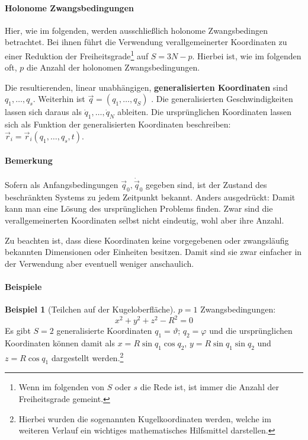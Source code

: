 \documentclass[oneside]{book}
\theoremstyle{definition}
\newtheorem*{beispiel*}{Beispiel}
\newcommand{\dotvec}[1]{\dot{\vec{#1}}}
\begin{document}
\paragraph{Holonome Zwangsbedingungen}
Hier, wie im folgenden, werden ausschließlich holonome Zwangsbedingen betrachtet. Bei ihnen führt die Verwendung verallgemeinerter Koordinaten zu einer Reduktion der Freiheitsgrade\footnote{Wenn im folgenden von $S$ oder $s$ die Rede ist, ist immer die Anzahl der Freiheitsgrade gemeint.} auf $S = 3N - p$. Hierbei ist, wie im folgenden oft, $p$ die Anzahl der holonomen Zwangsbedingungen. 

Die resultierenden, linear unabhängigen, \textbf{generalisierten Koordinaten} sind $q_1, \dots, q_s$. Weiterhin ist $\vec{q} = (q_1, \dots, q_S)$
. Die generalisierten Geschwindigkeiten lassen sich daraus als $\dot{q}_1, \dots, \dot{q}_N$ ableiten. Die ursprünglichen Koordinaten lassen sich als Funktion der generalisierten Koordinaten beschreiben: $\vec{r}_i = \vec{r}_i(q_1, \dots, q_s, t)$.

\paragraph{Bemerkung}
Sofern als Anfangsbedingungen $\vec{q}_0, \dotvec{q}_0$ gegeben sind, ist der Zustand des beschränkten Systems zu jedem Zeitpunkt bekannt. Anders ausgedrückt: Damit kann man eine Lösung des ursprünglichen Problems finden. Zwar sind die verallgemeinerten Koordinaten selbst nicht eindeutig, wohl aber ihre Anzahl.

Zu beachten ist, dass diese Koordinaten keine vorgegebenen oder zwangsläufig bekannten Dimensionen oder Einheiten besitzen. Damit sind sie zwar einfacher in der Verwendung aber eventuell weniger anschaulich.
\paragraph{Beispiele}

\begin{beispiel*}[Teilchen auf der Kugeloberfläche]
$p = 1$ Zwangsbedingungen:
$$x^2 + y^2 + z^2 - R^2 = 0$$
Es gibt $S = 2$ generalisierte Koordinaten $q_1 = \vartheta$; $q_2 = \varphi$ und die ursprünglichen Koordinaten können damit als $x = R \sin{q_1} \cos{q_2}$, $y = R \sin q_1 \sin q_2$ und $z = R \cos q_1$ dargestellt werden.\footnote{Hierbei wurden die sogenannten Kugelkoordinaten werden, welche im weiteren Verlauf ein wichtiges mathematisches Hilfsmittel darstellen.}
\end{beispiel*}
\end{document}

